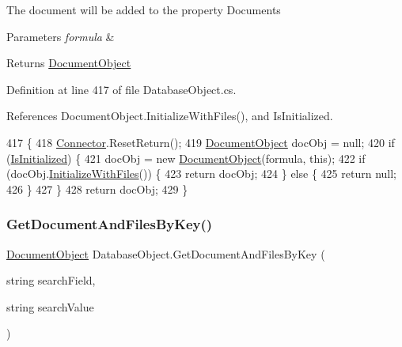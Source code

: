 The document will be added to the property \textquotesingle{}Documents\textquotesingle{}


\begin{DoxyParams}{Parameters}
{\em formula} & \\
\hline
\end{DoxyParams}
\begin{DoxyReturn}{Returns}
\mbox{\hyperlink{class_document_object}{Document\+Object}}
\end{DoxyReturn}


Definition at line 417 of file Database\+Object.\+cs.



References Document\+Object.\+Initialize\+With\+Files(), and Is\+Initialized.


\begin{DoxyCode}
417                                                                        \{
418         \mbox{\hyperlink{class_connector}{Connector}}.ResetReturn();
419         \mbox{\hyperlink{class_document_object}{DocumentObject}} docObj = null;
420         \textcolor{keywordflow}{if} (\mbox{\hyperlink{class_database_object_a5fe036d32a30eb10d1b3f6a30263f740}{IsInitialized}}) \{
421             docObj = \textcolor{keyword}{new} \mbox{\hyperlink{class_document_object}{DocumentObject}}(formula, \textcolor{keyword}{this});
422             \textcolor{keywordflow}{if} (docObj.\mbox{\hyperlink{class_document_object_a83f0e855adc5fb7afd02d2e34767f5c8}{InitializeWithFiles}}()) \{
423                 \textcolor{keywordflow}{return} docObj;
424             \} \textcolor{keywordflow}{else} \{
425                 \textcolor{keywordflow}{return} null;
426             \}
427         \}
428         \textcolor{keywordflow}{return} docObj;
429     \}
\end{DoxyCode}
\mbox{\label{class_database_object_a30968034c65328e44ddb0fdac8ab1435}} 
\subsubsection{\texorpdfstring{Get\+Document\+And\+Files\+By\+Key()}{GetDocumentAndFilesByKey()}}
{\footnotesize\ttfamily \mbox{\hyperlink{class_document_object}{Document\+Object}} Database\+Object.\+Get\+Document\+And\+Files\+By\+Key (\begin{DoxyParamCaption}\item[{string}]{search\+Field,  }\item[{string}]{search\+Value }\end{DoxyParamCaption})}




